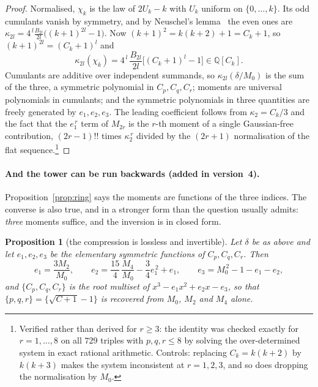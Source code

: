 \documentclass[11pt,a4paper]{article}
\newtheorem{proposition}{Proposition}
\begin{document}
\begin{proof}
Normalised, $\chi_k$ is the law of $2U_k-k$ with $U_k$ uniform on $\{0,\dots,k\}$. Its odd
cumulants vanish by symmetry, and by Neuschel's lemma~\cite[Lemma~2.1]{Neuschel} the even ones
are $\kappa_{2l}=4^{\,l}\frac{B_{2l}}{2l}\big((k+1)^{2l}-1\big)$. Now
$(k+1)^2=k(k+2)+1=C_k+1$, so $(k+1)^{2l}=(C_k+1)^l$ and
\[
\kappa_{2l}(\chi_k)=4^{\,l}\,\frac{B_{2l}}{2l}\Big[(C_k+1)^l-1\Big]\in\mathbb{Q}[C_k].
\]
Cumulants are additive over independent summands, so $\kappa_{2l}(\delta/M_0)$ is the sum of
the three, a symmetric polynomial in $C_p,C_q,C_r$; moments are universal polynomials in
cumulants; and the symmetric polynomials in three quantities are freely generated by
$e_1,e_2,e_3$. The leading coefficient follows from $\kappa_2=C_k/3$ and the fact that the
$e_1^{\,r}$ term of $M_{2r}$ is the $r$-th moment of a single Gaussian-free contribution,
$(2r-1)!!$ times $\kappa_2^{\,r}$ divided by the $(2r+1)$ normalisation of the flat
sequence.\footnote{Verified rather than derived for $r\ge3$: the identity was checked exactly
for $r=1,\dots,8$ on all $729$ triples with $p,q,r\le8$ by solving the over-determined system
in exact rational arithmetic. Controls: replacing $C_k=k(k+2)$ by $k(k+3)$ makes the system
inconsistent at $r=1,2,3$, and so does dropping the normalisation by $M_0$.}
\end{proof}

\paragraph{And the tower can be run backwards (added in version~4).} Proposition~\ref{prop:ring}
says the moments are functions of the three indices. The converse is also true, and in a stronger
form than the question usually admits: \emph{three} moments suffice, and the inversion is in closed
form.

\begin{proposition}[the compression is lossless and invertible]\label{prop:inverse}
Let $\delta$ be as above and let $e_1,e_2,e_3$ be the elementary symmetric functions of
$C_p,C_q,C_r$. Then
\begin{equation}\label{eq:inverse}
\boxed{\;
e_1=\frac{3M_2}{M_0},\qquad
e_2=\frac{15}{4}\,\frac{M_4}{M_0}-\frac34 e_1^{\,2}+e_1,\qquad
e_3=M_0^{\,2}-1-e_1-e_2,\;}
\end{equation}
and $\{C_p,C_q,C_r\}$ is the root multiset of $x^3-e_1x^2+e_2x-e_3$, so that
$\{p,q,r\}=\{\sqrt{C+1}-1\}$ is recovered from $M_0$, $M_2$ and $M_4$ alone.
\end{proposition}
\end{document}
